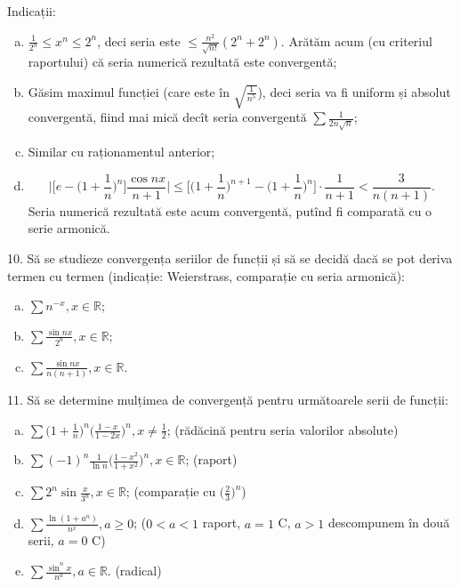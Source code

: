 \documentclass[11pt,a4paper]{article}
\newcommand\RR{\mathbb{R}}
\theoremstyle{dotless}
\theoremstyle{dotlessdr}
\begin{document}
Indicații:
\begin{enumerate}[(a)]
\item $\frac{1}{2^n} \leq x^n \leq 2^n$, deci seria este $\leq \frac{n^2}{\sqrt{n!}} (2^n + 2^n)$.
  Arătăm acum (cu criteriul raportului) că seria numerică rezultată este convergentă;
\item Găsim maximul funcției (care este în $\sqrt{\frac{1}{n^5}}$), deci seria va fi uniform
  și absolut convergentă, fiind mai mică decît seria convergentă $\sum \frac{1}{2n \sqrt{n}}$;
\item Similar cu raționamentul anterior;
\item
  \[
    \Big| \big[ e - \big(1 + \frac{1}{n}\big)^n \big] \frac{\cos nx}{n+1} \Big| \leq
    \Big[ \big( 1 + \frac{1}{n} \big)^{n + 1} - \big(1 + \frac{1}{n}\big)^n \Big] \cdot \frac{1}{n+1} < \frac{3}{n(n+1)}.
  \]
  Seria numerică rezultată este acum convergentă, putînd fi comparată cu o serie armonică.
\end{enumerate}

\vspace{1cm}

10. Să se studieze convergența seriilor de funcții și să se decidă dacă
se pot deriva termen cu termen (indicație: Weierstrass, comparație cu
seria armonică):
\begin{enumerate}[(a)]
\item $\sum n^{-x}, x \in \RR$;
\item $\sum \frac{\sin nx}{2^n}, x \in \RR$;
\item $\sum \frac{\sin nx}{n(n+1)}, x \in \RR$.
\end{enumerate}

\vspace{1cm}

11. Să se determine mulțimea de convergență pentru următoarele serii de funcții:
\begin{enumerate}[(a)]
\item $\sum \Big( 1 + \frac{1}{n} \Big)^n \Big( \frac{1 - x}{1 - 2x} \Big)^n, x \neq \frac{1}{2}$;
  (rădăcină pentru seria valorilor absolute)
\item $\sum (-1)^n \frac{1}{\ln n} \Big( \frac{1 - x^2}{1 + x^2} \Big)^n, x \in \RR$; (raport)
\item $\sum 2^n \sin \frac{x}{3^n}, x \in \RR$; (comparație cu $\Big( \frac{2}{3} \Big)^n$)
\item $\sum \frac{\ln(1 + a^n)}{n^x}, a \geq 0$; ($0 < a < 1$ raport, $a = 1$ C, $a > 1$ descompunem în două serii, $a = 0$ C)
\item $\sum \frac{\sin^n x}{n^a}, a \in \RR$. (radical)
\end{enumerate}
\end{document}
